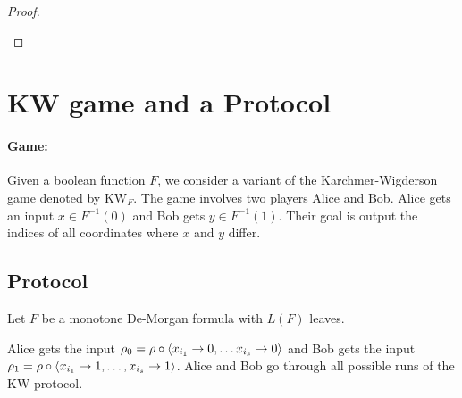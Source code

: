\documentclass{article}
\newcommand{\kw}{\mathrm{KW}}
\begin{document}
\begin{proof}
\begin{itemize}
\begin{itemize}
        \end{itemize}
        


    \end{itemize}
    
    
\end{proof}



\section{KW game and a Protocol}
    \paragraph{Game:} 
    Given a boolean function $F$, we consider a variant of the Karchmer-Wigderson game denoted by $\kw_F$. The game involves two players Alice and Bob.  
    Alice gets an input $x \in F^{-1}(0)$ and Bob gets $y \in F^{-1}(1)$. Their goal is output the indices of all coordinates where $x$ and $y$ differ.
    
\subsection{Protocol}
    \begin{lemma}
        Let $F$ be a monotone De-Morgan formula with $L(F)$ leaves.  
    \end{lemma}

    Alice gets the input $\rho_0 = \rho \circ \left\langle x_{i_1} \to 0, \ldots x_{i_s} \to 0\right\rangle$ and Bob gets the input $\rho_1 = \rho \circ \left\langle x_{i_1} \to 1, \ldots , x_{i_s} \to 1\right\rangle$.
    Alice and Bob go through all possible runs of the KW protocol. 

    
    
\end{document}

